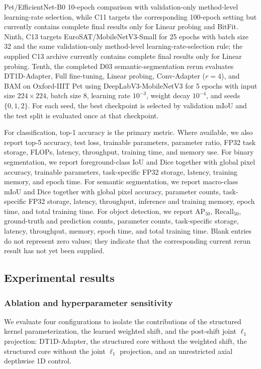 \documentclass[pdflatex,sn-mathphys-num]{sn-jnl}
\theoremstyle{thmstyleone}
\theoremstyle{thmstyletwo}
\theoremstyle{thmstylethree}
\begin{document}
Pet/EfficientNet-B0 10-epoch comparison with validation-only method-level learning-rate selection, while C11 targets the corresponding 100-epoch setting but currently contains complete final results only for Linear probing and BitFit. Ninth, C13 targets EuroSAT/MobileNetV3-Small for 25 epochs with batch size 32 and the same validation-only method-level learning-rate-selection rule; the supplied C13 archive currently contains complete final results only for Linear probing. Tenth, the completed D03 semantic-segmentation rerun evaluates DT1D-Adapter, Full fine-tuning, Linear probing, Conv-Adapter ($r=4$), and BAM on Oxford-IIIT Pet using DeepLabV3-MobileNetV3 for 5 epochs with input size $224\times224$, batch size 8, learning rate $10^{-3}$, weight decay $10^{-4}$, and seeds $\{0,1,2\}$. For each seed, the best checkpoint is selected by validation mIoU and the test split is evaluated once at that checkpoint.

For classification, top-1 accuracy is the primary metric. Where available, we also report top-5 accuracy, test loss, trainable parameters, parameter ratio, FP32 task storage, FLOPs, latency, throughput, training time, and memory use. For binary segmentation, we report foreground-class IoU and Dice together with global pixel accuracy, trainable parameters, task-specific FP32 storage, latency, training memory, and epoch time. For semantic segmentation, we report macro-class mIoU and Dice together with global pixel accuracy, parameter counts, task-specific FP32 storage, latency, throughput, inference and training memory, epoch time, and total training time. For object detection, we report $\mathrm{AP}_{50}$, $\mathrm{Recall}_{50}$, ground-truth and prediction counts, parameter counts, task-specific storage, latency, throughput, memory, epoch time, and total training time. Blank entries do not represent zero values; they indicate that the corresponding current rerun result has not yet been supplied.

\subsection{Experimental results}
\label{subsec:experimental_results}

\subsubsection{Ablation and hyperparameter sensitivity}
\label{subsec:ablation_sensitivity}

We evaluate four configurations to isolate the contributions of the structured kernel parameterization, the learned weighted shift, and the post-shift joint $\ell_1$ projection: DT1D-Adapter, the structured core without the weighted shift, the structured core without the joint $\ell_1$ projection, and an unrestricted axial depthwise 1D control.
\end{document}
